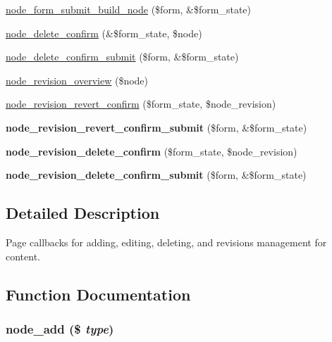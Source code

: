 \begin{CompactItemize}
\item 
\hyperlink{node_8pages_8inc_09cc7aec34e871fc093e18e18b8f4889}{node\_\-form\_\-submit\_\-build\_\-node} (\$form, \&\$form\_\-state)
\item 
\hyperlink{node_8pages_8inc_ec7f2c58fcb8c1f3f58757781cee4ed3}{node\_\-delete\_\-confirm} (\&\$form\_\-state, \$node)
\item 
\hyperlink{node_8pages_8inc_2d744b2bdca2ec49b8eaa0fc7c69e1c3}{node\_\-delete\_\-confirm\_\-submit} (\$form, \&\$form\_\-state)
\item 
\hyperlink{node_8pages_8inc_1654ae495e6814b2f08c7a8e4aeabd68}{node\_\-revision\_\-overview} (\$node)
\item 
\hyperlink{node_8pages_8inc_0402ef184e558e0cc3c679318a27e43d}{node\_\-revision\_\-revert\_\-confirm} (\$form\_\-state, \$node\_\-revision)
\item 
\hypertarget{node_8pages_8inc_e22f280976210711cb3bd363caa6d956}{
\textbf{node\_\-revision\_\-revert\_\-confirm\_\-submit} (\$form, \&\$form\_\-state)}
\label{node_8pages_8inc_e22f280976210711cb3bd363caa6d956}

\item 
\hypertarget{node_8pages_8inc_a199f797ba83b2715d66ec4e767bf819}{
\textbf{node\_\-revision\_\-delete\_\-confirm} (\$form\_\-state, \$node\_\-revision)}
\label{node_8pages_8inc_a199f797ba83b2715d66ec4e767bf819}

\item 
\hypertarget{node_8pages_8inc_d6e0dfda7fccc07dfd93dd257e8ed99f}{
\textbf{node\_\-revision\_\-delete\_\-confirm\_\-submit} (\$form, \&\$form\_\-state)}
\label{node_8pages_8inc_d6e0dfda7fccc07dfd93dd257e8ed99f}

\end{CompactItemize}


\subsection{Detailed Description}
Page callbacks for adding, editing, deleting, and revisions management for content. 

\subsection{Function Documentation}
\hypertarget{node_8pages_8inc_29be8dfd0fadad9f4399d50ab3615461}{
\subsubsection[{node\_\-add}]{\setlength{\rightskip}{0pt plus 5cm}node\_\-add (\$ {\em type})}}
\label{node_8pages_8inc_29be8dfd0fadad9f4399d50ab3615461}


